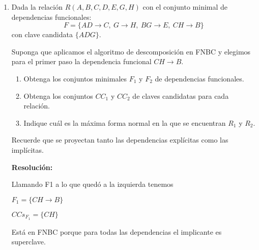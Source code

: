 \documentclass[a4paper,12pt]{article}
\begin{document}
\begin{enumerate}[label=\textbf{\arabic*.}]
    \item Dada la relación $R(A,B,C,D,E,G,H)$ con el conjunto minimal de dependencias funcionales:
    \[
        F = \{AD \rightarrow C,\ G \rightarrow H,\ BG \rightarrow E,\ CH \rightarrow B\}
    \]
    con clave candidata $\{ADG\}$.

    \noindent
    Suponga que aplicamos el algoritmo de descomposición en FNBC y elegimos para el primer paso la dependencia funcional $CH \rightarrow B$.

    \begin{enumerate}[label=\alph*)]
        \item Obtenga los conjuntos minimales $F_1$ y $F_2$ de dependencias funcionales.
        \item Obtenga los conjuntos $CC_1$ y $CC_2$ de claves candidatas para cada relación.
        \item Indique cuál es la máxima forma normal en la que se encuentran $R_1$ y $R_2$.
    \end{enumerate}

    \noindent
    Recuerde que se proyectan tanto las dependencias explícitas como las implícitas.

    \vspace{0.4cm}

    \textbf{Resolución:}

    \vspace{0.2cm}
    
\begin{center}
\end{center}

Llamando F1 a lo que quedó a la izquierda tenemos 

$F_1=\{CH\rightarrow B\}$

$CCs_{F_1}=\{CH\}$

Está en FNBC porque para todas las dependencias el implicante es superclave.


\end{enumerate}
\end{document}
